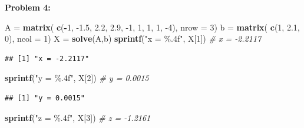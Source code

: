 \documentclass[11pt]{article}
\newenvironment{problem}[1]{\textbf{Problem #1: }}{\newpage}
\newenvironment{Shaded}{\begin{snugshade}}{\end{snugshade}}
\newcommand{\CommentTok}[1]{\textcolor[rgb]{0.56,0.35,0.01}{\textit{#1}}}
\newcommand{\DataTypeTok}[1]{\textcolor[rgb]{0.13,0.29,0.53}{#1}}
\newcommand{\DecValTok}[1]{\textcolor[rgb]{0.00,0.00,0.81}{#1}}
\newcommand{\FloatTok}[1]{\textcolor[rgb]{0.00,0.00,0.81}{#1}}
\newcommand{\KeywordTok}[1]{\textcolor[rgb]{0.13,0.29,0.53}{\textbf{#1}}}
\newcommand{\NormalTok}[1]{#1}
\newcommand{\OperatorTok}[1]{\textcolor[rgb]{0.81,0.36,0.00}{\textbf{#1}}}
\newcommand{\StringTok}[1]{\textcolor[rgb]{0.31,0.60,0.02}{#1}}
\begin{document}
\begin{problem}{4}
\begin{enumerate}[label = (\roman*)]
\begin{Shaded}
\begin{Highlighting}[]
\NormalTok{A =}\StringTok{ }\KeywordTok{matrix}\NormalTok{( }\KeywordTok{c}\NormalTok{(}\OperatorTok{-}\DecValTok{1}\NormalTok{, }\FloatTok{-1.5}\NormalTok{, }\FloatTok{2.2}\NormalTok{, }\FloatTok{2.9}\NormalTok{, }\DecValTok{-1}\NormalTok{, }\DecValTok{1}\NormalTok{, }\DecValTok{1}\NormalTok{, }\DecValTok{1}\NormalTok{, }\DecValTok{-4}\NormalTok{), }\DataTypeTok{nrow =} \DecValTok{3}\NormalTok{)}
\NormalTok{b =}\StringTok{ }\KeywordTok{matrix}\NormalTok{( }\KeywordTok{c}\NormalTok{(}\DecValTok{1}\NormalTok{, }\FloatTok{2.1}\NormalTok{, }\DecValTok{0}\NormalTok{), }\DataTypeTok{ncol =} \DecValTok{1}\NormalTok{)}
\NormalTok{X =}\StringTok{ }\KeywordTok{solve}\NormalTok{(A,b)}
\KeywordTok{sprintf}\NormalTok{(}\StringTok{"x = \%.4f"}\NormalTok{, X[}\DecValTok{1}\NormalTok{]) }\CommentTok{# x = -2.2117}
\end{Highlighting}
\end{Shaded}

\begin{verbatim}
## [1] "x = -2.2117"
\end{verbatim}

\begin{Shaded}
\begin{Highlighting}[]
\KeywordTok{sprintf}\NormalTok{(}\StringTok{"y = \%.4f"}\NormalTok{, X[}\DecValTok{2}\NormalTok{]) }\CommentTok{# y = 0.0015}
\end{Highlighting}
\end{Shaded}

\begin{verbatim}
## [1] "y = 0.0015"
\end{verbatim}

\begin{Shaded}
\begin{Highlighting}[]
\KeywordTok{sprintf}\NormalTok{(}\StringTok{"z = \%.4f"}\NormalTok{, X[}\DecValTok{3}\NormalTok{]) }\CommentTok{# z = -1.2161}
\end{Highlighting}
\end{Shaded}


\end{enumerate}
\end{problem}
\end{document}
